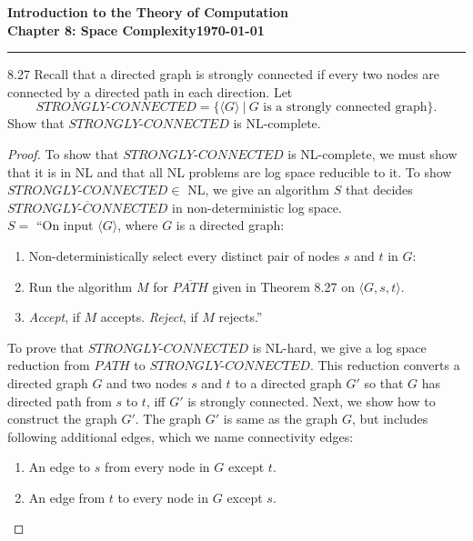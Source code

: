 \documentclass[11pt]{article}
\newcommand{\dated}{\today}
\begin{document}
\textbf{Introduction to the Theory of
Computation}\hfill\textbf{\myname}\\[0.01in]
\textbf{Chapter 8: Space Complexity}\hfill\textbf{\dated}\\
\smallskip\hrule\bigskip

\begin{problem}{8.27}
Recall that a directed graph is strongly connected if every two nodes are connected by a directed path in each direction. Let
\[
STRONGLY\text{-}CONNECTED = \{\langle G \rangle \ | \ G \text{ is a strongly connected graph}\}.
\]
Show that $STRONGLY\text{-}CONNECTED$ is NL-complete.
\end{problem}

\begin{proof}
To show that $STRONGLY\text{-}CONNECTED$ is NL-complete, we must show that it is in NL and that all NL problems are log space reducible to it. To show $STRONGLY\text{-}CONNECTED \in$ NL, we give an algorithm $S$ that decides $\overline{STRONGLY\text{-}CONNECTED}$ in non-deterministic log space. \\

$S =$ \textquotedblleft On input $\langle G \rangle$, where $G$ is a directed graph:
\begin{enumerate}
\item Non-deterministically select every distinct pair of nodes $s$ and $t$ in $G$:
\item \hspace*{0.5cm} Run the algorithm $M$ for $\overline{PATH}$ given in Theorem 8.27 on $\langle G, s, t \rangle$.
\item \hspace*{0.5cm} \textit{Accept}, if $M$ accepts. \textit{Reject}, if $M$ rejects.\textquotedblright
\end{enumerate}

To prove that $STRONGLY\text{-}CONNECTED$ is NL-hard, we give a log space reduction from $PATH$ to $STRONGLY\text{-}CONNECTED$. This reduction converts a directed graph $G$ and two nodes $s$ and $t$ to a directed graph $G'$ so that $G$ has directed path from $s$ to $t$, iff $G'$ is strongly connected. Next, we show how to construct the graph $G'$. The graph $G'$ is same as the graph $G$, but includes following additional edges, which we name connectivity edges:
\begin{enumerate}
\item An edge to $s$ from every node in $G$ except $t$.
\item An edge from $t$ to every node in $G$ except $s$.
\end{enumerate}


\end{proof}
\end{document}
